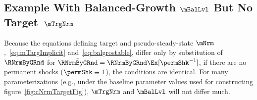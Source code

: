 \documentclass[BufferStockTheory]{subfiles}
\begin{document}
\begin{comment}
The proofs of these theorems are intuitive, and almost completely parallel; to save space, they are relegated to Appendix~\ref{sec:ApndxMTargetIsStable}.
They involve three steps:
\begin{enumerate}
\item Existence and continuity of $\Ex_{t}[\mNrm_{t+1}/\mNrm_{t}]$ (theorem~\ref{thm:target}) or $\Ex_{t}[\mNrm_{t+1}\permShk_{t+1}/\mNrm_{t}]$ (theorem~\ref{thm:MSSBalExists})
  \begin{itemize}
  \item This follows from existence and continuity of the constituents
  \end{itemize}
\item Existence of the equilibrium point
  \begin{itemize}
  \item This follows from existence of upper and lower bound limiting MPCs, existence and continuity of the decision rule, and the Intermediate Value Theorem
  \end{itemize}
\item Monotonicity of $\Ex_{t}[{\mNrm}_{t+1}-\mNrm_{t}]$ or $\Ex_{t}[{\mNrm}_{t+1}\permShk_{t+1}-\mNrm_{t}]$
  \begin{itemize}
  \item This follows from concavity of the consumption function
  \end{itemize}
\end{enumerate}

\end{comment}

\subsection{Example With Balanced-Growth \texorpdfstring{$\mBalLvl$}{m} But No Target~\texorpdfstring{$\mTrgNrm$}{m}}

Because the equations defining target and pseudo-steady-state $\mNrm$,~\eqref{eq:mTargImplicit} and~\eqref{eq:balgrostable}, differ only by substitution of $\RNrmByGRnd$ for $\bar{\RNrmByGRnd}=\RNrmByGRnd \Ex[\permShk^{-1}]$, if there are no permanent shocks ($\permShk \equiv 1$), the conditions are identical.
For many parameterizations (e.g., under the baseline parameter values used for constructing figure~\ref{fig:cNrmTargetFig}), $\mTrgNrm$ and $\mBalLvl$ will not differ much.

\renewcommand{\figFile}{GICModFailsButGICRawHolds}
\hypertarget{\figFile}{}

\end{document}
